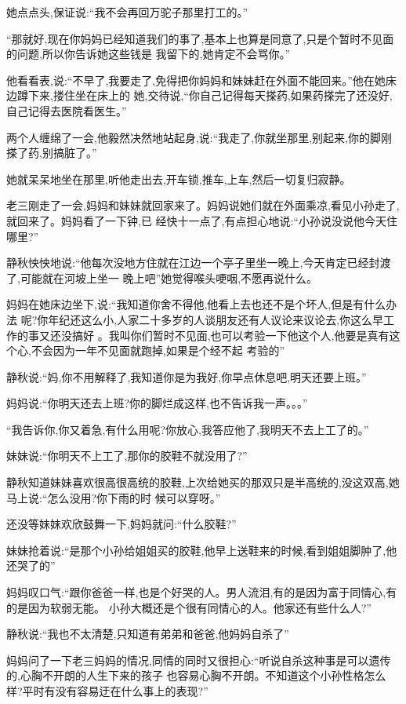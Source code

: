 ﻿\documentclass[12pt]{article}
\begin{document}
她点点头,保证说:``我不会再回万驼子那里打工的。''

``那就好,现在你妈妈已经知道我们的事了,基本上也算是同意了,只是个暂时不见面的问题,所以你告诉她这些钱是
我留下的,她肯定不会骂你。''

他看看表,说:``不早了,我要走了,免得把你妈妈和妹妹赶在外面不能回来。''他在她床边蹲下来,搂住坐在床上的
她,交待说,``你自己记得每天搽药,如果药搽完了还没好,自己记得去医院看医生。''

两个人缠绵了一会,他毅然决然地站起身,说:``我走了,你就坐那里,别起来,你的脚刚搽了药,别搞脏了。''

她就呆呆地坐在那里,听他走出去,开车锁,推车,上车,然后一切复归寂静。

老三刚走了一会,妈妈和妹妹就回家来了。妈妈说她们就在外面乘凉,看见小孙走了,就回来了。妈妈看了一下钟,已
经快十一点了,有点担心地说:``小孙说没说他今天住哪里?''

静秋怏怏地说:``他每次没地方住就在江边一个亭子里坐一晚上\myrule ,今天肯定已经封渡了,可能就在河坡上坐一
晚上吧\myrule ''她觉得喉头哽咽,不愿再说什么。

妈妈在她床边坐下,说:``我\myrule 知道你\myrule 舍不得他,他看上去也还\myrule 不是个坏人,但是有什么办法
呢?你年纪还这么小,人家二十多岁的人谈朋友还有人议论来议论去,你这么早\myrule 工作的事又还没搞好\myrule 
。我叫你们暂时不见面,也可以考验一下他这个人,他要是真有这个心,不会因为一年不见面就跑掉,如果是个经不起
考验的\myrule ''

静秋说:``妈,你不用解释了,我知道你是为我好,你早点休息吧,明天还要上班。''

妈妈说:``你明天还去上班?你的脚烂成这样,也不告诉我一声。。。''

``我告诉你,你又着急,有什么用呢?你放心,我答应他了,我明天不去上工了的。''

妹妹说:``你明天不上工了,那你的胶鞋不就没用了?''

静秋知道妹妹喜欢很高很高统的胶鞋,上次给她买的那双只是半高统的,没这双高,她马上说:``怎么没用?你下雨的时
候可以穿呀。''

还没等妹妹欢欣鼓舞一下,妈妈就问:``什么胶鞋?''

妹妹抢着说:``是那个小孙给姐姐买的胶鞋,他早上送鞋来的时候,看到姐姐脚肿了,他还哭了的\myrule ''

妈妈叹口气:``跟你爸爸一样,也是个好哭的人\myrule 。男人流泪,有的是因为富于同情心,有的是因为软弱无能。
小孙大概还是个很有同情心的人\myrule 。他家还有些什么人?''

静秋说:``我也不太清楚,只知道有弟弟和爸爸,他妈妈\myrule 自杀了\myrule ''

妈妈问了一下老三妈妈的情况,同情的同时又很担心:``听说自杀这种事是可以遗传的,心胸不开朗的人生下来的孩子
也容易心胸不开朗。不知道这个小孙性格怎么样?平时有没有容易迂在什么事上的表现?''
\end{document}
